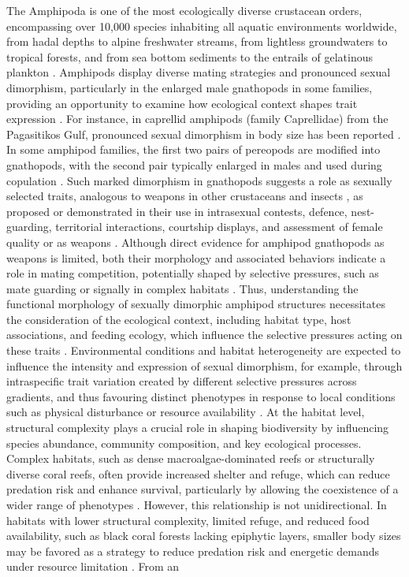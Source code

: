 \documentclass[journal,article,submit,pdftex,moreauthors]{Definitions/mdpi}
\begin{document}
The Amphipoda is one of the most ecologically diverse crustacean orders, encompassing over 10,000 species \citep{arfianti2018progress, horton2023world} inhabiting all aquatic environments worldwide, from hadal depths to alpine freshwater streams, from lightless groundwaters to tropical forests, and from sea bottom sediments to the entrails of gelatinous plankton \citep{lowry2017phylogeny}. Amphipods display diverse mating strategies and pronounced sexual dimorphism, particularly in the enlarged male gnathopods in some families, providing an opportunity to examine how ecological context shapes trait expression \citep{navarro2025inside, copilaș2021morphology}. For instance, in caprellid amphipods (family Caprellidae) from the Pagasitikos Gulf, pronounced sexual dimorphism in body size has been reported \citep{lolas2013population}. In some amphipod families, the first two pairs of pereopods are modified into gnathopods, with the second pair typically enlarged in males and used during copulation \citep{hume2005sexual}. Such marked dimorphism in gnathopods suggests a role as sexually selected traits, analogous to weapons in other crustaceans and insects \citep{emlen2008evolution}, as proposed or demonstrated in their use in intrasexual contests, defence, nest-guarding, territorial interactions, courtship displays, and assessment of female quality or as weapons \citep{Wellborn2000, takeshita2012morphological, darwin2011new, thomas2007new, longo2021snaps}. Although direct evidence for amphipod gnathopods as weapons is limited, both their morphology and associated behaviors indicate a role in mating competition, potentially shaped by selective pressures, such as mate guarding or signally in complex habitats \citep{clutton1982functions}. Thus, understanding the functional morphology of sexually dimorphic amphipod structures necessitates the consideration of the ecological context, including habitat type, host associations, and feeding ecology, which influence the selective pressures acting on these traits \citep{Wellborn2000, wellborn2002trade, wellborn2005ecological}. Environmental conditions and habitat heterogeneity are expected to influence the intensity and expression of sexual dimorphism, for example, through intraspecific trait variation created by different selective pressures across gradients, and thus favouring distinct phenotypes in response to local conditions such as physical disturbance or resource availability  \citep{Bolnick2003}. At the habitat level, structural complexity plays a crucial role in shaping biodiversity by influencing species abundance, community composition, and key ecological processes. Complex habitats, such as dense macroalgae-dominated reefs or structurally diverse coral reefs, often provide increased shelter and refuge, which can reduce predation risk and enhance survival, particularly by allowing the coexistence of a wider range of phenotypes \citep{NavarroMayoral2020, navarro2023drivers}. However, this relationship is not unidirectional. In habitats with lower structural complexity, limited refuge, and reduced food availability, such as black coral forests lacking epiphytic layers, smaller body sizes may be favored as a strategy to reduce predation risk and energetic demands under resource limitation \citep{navarro2025inside}. From an 
\end{document}
